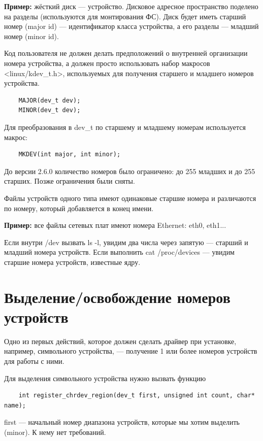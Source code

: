 \textbf{Пример:} жёсткий диск --- устройство. Дисковое адресное пространство поделено на разделы (используются для монтирования ФС). Диск будет иметь старший номер (major id) --- идентификатор класса устройства, а его разделы --- младший номер (minor id).  

Код пользователя не должен делать предположений о внутренней организации номера устройства, а должен просто использовать набор макросов <linux/kdev\_t.h>, используемых для получения старшего и младшего номеров устройства.

\begin{lstlisting}
	MAJOR(dev_t dev);
	MINOR(dev_t dev);
\end{lstlisting}

Для преобразования в dev\_t по старшему и младшему номерам используется макрос:

\begin{lstlisting}
	MKDEV(int major, int minor);
\end{lstlisting}

До версии 2.6.0 количество номеров было ограничено: до 255 младших и до 255 старших. Позже ограничения были сняты.

Файлы устройств одного типа имеют одинаковые старшие номера и различаются по номеру, который добавляется в конец имени. 

\textbf{Пример:} все файлы сетевых плат имеют номера Ethernet: eth0, eth1...

Если внутри /dev вызвать ls -l, увидим два числа через запятую --- старший и младший номера устройств. Если выполнить cat /proc/devices --- увидим старшие номера устройств, известные ядру.

\section{Выделение/освобождение номеров устройств}

Одно из первых действий, которое должен сделать драйвер при установке, например, символьного устройства, --- получение 1 или более номеров устройств для работы с ними. 

Для выделения символьного устройства нужно вызвать функцию

\begin{lstlisting}
	int register_chrdev_region(dev_t first, unsigned int count, char* name);
\end{lstlisting}

first --- начальный номер диапазона устройств, которые мы хотим выделить (minor). К нему нет требований.

